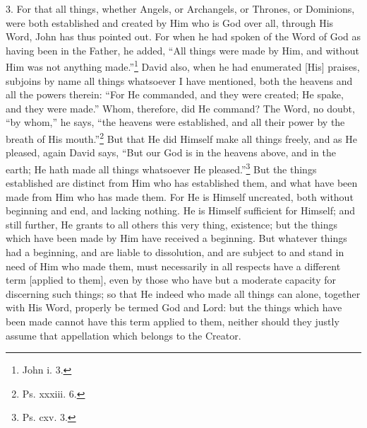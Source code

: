 3. For that all things, whether Angels, or Archangels, or Thrones, or Dominions, were both established and created by Him who is God over all, through His Word, John has thus pointed out. For when he had spoken of the Word of God as having been in the Father, he added, “All things were made by Him, and without Him was not anything made.”\footnote{John i. 3.} David also, when he had enumerated [His] praises, subjoins by name all things whatsoever I have mentioned, both the heavens and all the powers therein: “For He commanded, and they were created; He spake, and they were made.” Whom, therefore, did He command? The Word, no doubt, “by whom,” he says, “the heavens were established, and all their power by the breath of His mouth.”\footnote{Ps. xxxiii. 6.} But that He did Himself  make all things freely, and as He pleased, again David says, “But our God is in the heavens above, and in the earth; He hath made all things whatsoever He pleased.”\footnote{Ps. cxv. 3.} But the things established are distinct from Him who has established them, and what have been made from Him who has made them. For He is Himself uncreated, both without beginning and end, and lacking nothing. He is Himself sufficient for Himself; and still further, He grants to all others this very thing, existence; but the things which have been made by Him have received a beginning. But whatever things had a beginning, and are liable to dissolution, and are subject to and stand in need of Him who made them, must necessarily in all respects have a different term [applied to them], even by those who have but a moderate capacity for discerning such things; so that He indeed who made all things can alone, together with His Word, properly be termed God and Lord: but the things which have been made cannot have this term applied to them, neither should they justly assume that appellation which belongs to the Creator.


